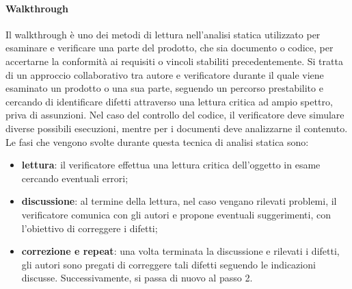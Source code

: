 \paragraph{Walkthrough}
Il walkthrough è uno dei metodi di lettura nell'analisi statica utilizzato per esaminare e verificare una parte del prodotto, che sia documento o codice, per accertarne la conformità ai requisiti o vincoli stabiliti precedentemente.
Si tratta di un approccio collaborativo tra autore e verificatore durante il quale viene esaminato un prodotto o una sua parte, seguendo un percorso prestabilito e cercando di identificare difetti attraverso una lettura critica ad ampio spettro, priva di assunzioni.
Nel caso del controllo del codice, il verificatore deve simulare diverse possibili esecuzioni, mentre per i documenti deve analizzarne il contenuto.
Le fasi che vengono svolte durante questa tecnica di analisi statica sono:
\begin{itemize}
    \item \textbf{lettura}: il verificatore effettua una lettura critica dell'oggetto in esame cercando eventuali errori;
    \item \textbf{discussione}: al termine della lettura, nel caso vengano rilevati problemi, il verificatore comunica con gli autori e propone eventuali suggerimenti, con l'obiettivo di correggere i difetti;
    \item \textbf{correzione e repeat}: una volta terminata la discussione e rilevati i difetti, gli autori sono pregati di correggere tali difetti seguendo le indicazioni discusse. Successivamente, si passa di nuovo al passo 2.
\end{itemize}
